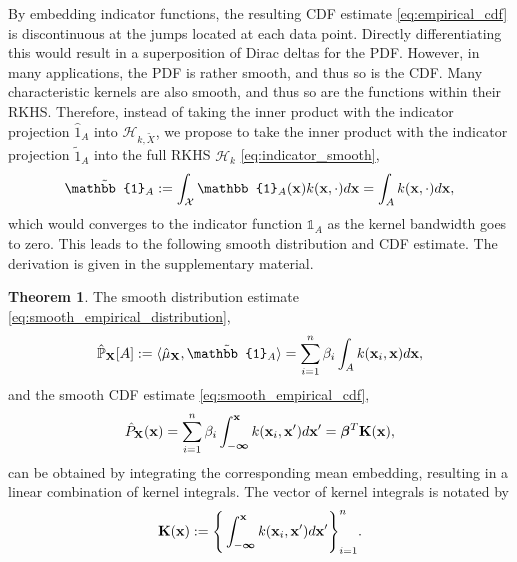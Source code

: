 \documentclass[twoside]{article} \usepackage{aistats2017}
\theoremstyle{definition}
\theoremstyle{theorem}
\newtheorem{theorem}{Theorem}[section]
\newcommand{\rv}[1]{{#1}}
\newcommand{\ds}[1]{\tilde{#1}}
\newcommand{\inner}[2]{{\langle #1, #2 \rangle}}
\begin{document}
		By embedding indicator functions, the resulting CDF estimate \eqref{eq:empirical_cdf} is discontinuous at the jumps located at each data point. Directly differentiating this would result in a superposition of Dirac deltas for the PDF. However, in many applications, the PDF is rather smooth, and thus so is the CDF. Many characteristic kernels are also smooth, and thus so are the functions within their RKHS. Therefore, instead of taking the inner product with the indicator projection $\hat{1}_{A}$ into $\mathcal{H}_{k, \ds{X}}$, we propose to take the inner product with the indicator projection $\tilde{1}_{A}$ into the full RKHS $\mathcal{H}_{k}$ \eqref{eq:indicator_smooth},
		\begin{equation}
			\tilde{\mathbb{1}}_{A} := \int_{\mathcal{X}} \mathbb{1}_{A}(\bvec{x}) k(\bvec{x}, \cdot) d\bvec{x} = \int_{A} k(\bvec{x}, \cdot) d\bvec{x},
		\label{eq:indicator_smooth}
		\end{equation}
		which would converges to the indicator function $\mathbb{1}_{A}$ as the kernel bandwidth goes to zero. This leads to the following smooth distribution and CDF estimate. The derivation is given in the supplementary material.
		\begin{theorem} \label{thm:smooth_empirical_distribution_and_cdf}
			The smooth distribution estimate \eqref{eq:smooth_empirical_distribution},
			\begin{equation}
				\hat{\mathbb{P}}_{\bvec{\rv{X}}}[A] := \inner{\hat{\mu}_{\bvec{\rv{X}}}}{\tilde{\mathbb{1}}_{A}} = \sum_{i = 1}^{n} \beta_{i} \int_{A}  k(\bvec{x}_{i}, \bvec{x}) d\bvec{x},
			\label{eq:smooth_empirical_distribution}
			\end{equation}
			and the smooth CDF estimate \eqref{eq:smooth_empirical_cdf},
			\begin{equation}
				\hat{P}_{\bvec{\rv{X}}}(\bvec{x}) = \sum_{i = 1}^{n} \beta_{i} \int_{-\bm{\infty}}^{\bvec{x}}  k(\bvec{x}_{i}, \bvec{x}') d\bvec{x}' = \bm{\beta}^{T} \bvec{K}(\bvec{x}),
			\label{eq:smooth_empirical_cdf}
			\end{equation}
			can be obtained by integrating the corresponding mean embedding, resulting in a linear combination of kernel integrals. The vector of kernel integrals is notated by
			\begin{equation}
				\mathbf{K}(\mathbf{x}) := \Bigg\{ \int_{-\bm{\infty}}^{\mathbf{x}}  k(\mathbf{x}_{i}, \mathbf{x}') d\mathbf{x}' \Bigg\}_{i = 1}^{n}.
			\label{eq:kernel_integral}
			\end{equation}
		\end{theorem}
\end{document}
